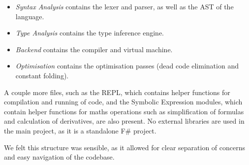 \begin{itemize}
    \item \textit{Syntax Analysis} contains the lexer and parser, as well as the AST of the language.
    \item \textit{Type Analysis} contains the type inference engine.
    \item \textit{Backend} contains the compiler and virtual machine.
    \item \textit{Optimisation} contains the optimisation passes (dead code elimination and constant folding).
\end{itemize}

A couple more files, such as the REPL, which contains helper functions for compilation and running of code, and the
Symbolic Expression modules, which contain helper functions for maths operations such as simplification of formulas 
and calculation of derivatives, are also present.
No external libraries are used in the main project, as it is a standalone F\# project.

We felt this structure was sensible, as it allowed for clear separation of concerns and easy navigation of the codebase.


